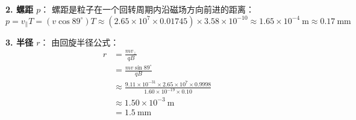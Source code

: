 \begin{solution}
\begin{enumerate}
    \textbf{2. 螺距 $p$}：
    螺距是粒子在一个回转周期内沿磁场方向前进的距离：
    $$ p = v_{\parallel} T = (v \cos 89^\circ) T \approx (2.65 \times 10^7 \times 0.01745) \times 3.58 \times 10^{-10} \approx 1.65 \times 10^{-4} \ \mathrm{m} \approx 0.17 \ \mathrm{mm} $$

    \textbf{3. 半径 $r$}：
    由回旋半径公式：
    \[
    \begin{aligned}
    r &= \frac{m v_{\perp}}{qB}\\
      &= \frac{m v \sin 89^\circ}{qB}\\
      &\approx \frac{9.11 \times 10^{-31} \times 2.65 \times 10^7 \times 0.9998}{1.60 \times 10^{-19} \times 0.10}\\
      &\approx 1.50 \times 10^{-3} \ \mathrm{m}\\
      &= 1.5 \ \mathrm{mm}
    \end{aligned}
    \]
\end{enumerate}
\end{solution}

